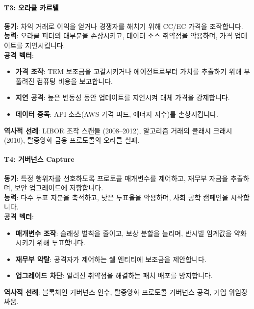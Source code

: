 \documentclass[11pt]{article}
\begin{document}
\paragraph{T3: 오라클 카르텔}
\textbf{동기}: 차익 거래로 이익을 얻거나 경쟁자를 해치기 위해 CC/EC 가격을 조작합니다.\\
\textbf{능력}: 오라클 피더의 대부분을 손상시키고, 데이터 소스 취약점을 악용하며, 가격 업데이트를 지연시킵니다.\\
\textbf{공격 벡터}:
\begin{itemize}[noitemsep]
  \item \textbf{가격 조작}: TEM 보조금을 고갈시키거나 에이전트로부터 가치를 추출하기 위해 부풀려진 컴퓨팅 비용을 보고합니다.
  \item \textbf{지연 공격}: 높은 변동성 동안 업데이트를 지연시켜 대체 가격을 강제합니다.
  \item \textbf{데이터 중독}: API 소스(AWS 가격 피드, 에너지 지수)를 손상시킵니다.
\end{itemize}
\textbf{역사적 선례}: LIBOR 조작 스캔들 (2008--2012), 알고리즘 거래의 플래시 크래시 (2010), 탈중앙화 금융 프로토콜의 오라클 실패.

\paragraph{T4: 거버넌스 Capture}
\textbf{동기}: 특정 행위자를 선호하도록 프로토콜 매개변수를 제어하고, 재무부 자금을 추출하며, 보안 업그레이드에 저항합니다.\\
\textbf{능력}: 다수 투표 지분을 축적하고, 낮은 투표율을 악용하며, 사회 공학 캠페인을 시작합니다.\\
\textbf{공격 벡터}:
\begin{itemize}[noitemsep]
  \item \textbf{매개변수 조작}: 슬래싱 벌칙을 줄이고, 보상 분할을 늘리며, 반시빌 임계값을 약화시키기 위해 투표합니다.
  \item \textbf{재무부 약탈}: 공격자가 제어하는 쉘 엔티티에 보조금을 제안합니다.
  \item \textbf{업그레이드 차단}: 알려진 취약점을 해결하는 패치 배포를 방지합니다.
\end{itemize}
\textbf{역사적 선례}: 블록체인 거버넌스 인수, 탈중앙화 프로토콜 거버넌스 공격, 기업 위임장 싸움.
\end{document}
